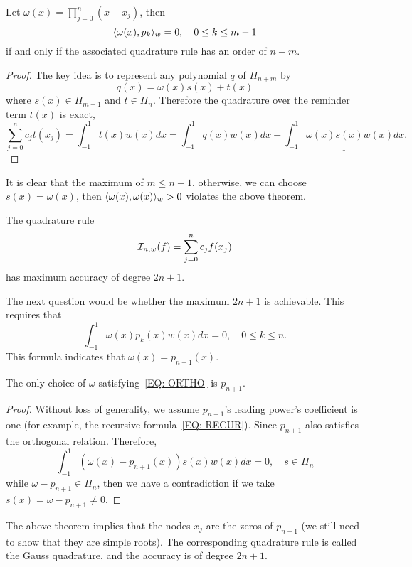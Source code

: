 \begin{theorem}
    Let $\omega(x) = \prod_{j=0}^{n}(x - x_j)$, then
    $$\langle {\omega(x), p_{k}} \rangle_w = 0,\quad 0\le k\le {m-1}$$
    if and only if the associated quadrature rule has an order of $n + m$.
\end{theorem}
\begin{proof}
    The key idea is to represent any polynomial $q$ of $\Pi_{n+m}$ by 
    \begin{equation}
        q(x) = \omega(x) s(x) + t(x)
    \end{equation}
    where $s(x)\in\Pi_{m-1}$ and $t\in \Pi_{n}$. Therefore the quadrature over the reminder term $t(x)$ is exact,
    \begin{equation}
        \sum_{j=0}^n c_j t(x_j) =  \int_{-1}^1 t(x) w(x) dx = \int_{-1}^1 q(x) w(x)dx - \underline{\int_{-1}^1 \omega(x) s(x) w(x) dx}.
    \end{equation}
\end{proof}
It is clear that the maximum of $m \le n+1$, otherwise, we can choose $ s(x) = \omega(x)$, then $\langle {\omega(x), \omega(x)} \rangle_w > 0$ violates the above theorem.
\begin{corollary}
    The quadrature rule 
    $$\mathcal I_{n, w}(f)=\sum_{j=0}^n c_j f(x_j)$$
    has maximum accuracy of degree $2n+1$. 
\end{corollary}
The next question would be whether the maximum $2n+1$ is achievable. This requires that
\begin{equation}\label{EQ: ORTHO}
    \int_{-1}^1 \omega(x) p_k(x) w(x) dx = 0,\quad 0\le k\le n.
\end{equation}
This formula indicates that $\omega(x) = p_{n+1}(x)$.
\begin{theorem}
    The only choice of $\omega$ satisfying~\eqref{EQ: ORTHO} is $p_{n+1}$.
\end{theorem}
\begin{proof}
    Without loss of generality, we assume $p_{n+1}$'s leading power's coefficient is one (for example, the recursive formula~\eqref{EQ: RECUR}). Since $p_{n+1}$ also satisfies the orthogonal relation. Therefore,
    \begin{equation}
        \int_{-1}^1 (\omega(x) - p_{n+1}(x)) s(x) w(x)dx = 0,\quad s\in\Pi_n
    \end{equation}
    while $\omega - p_{n+1}\in\Pi_n$, then we have a contradiction if we take $s(x) = \omega -  p_{n+1}\neq 0$. 
\end{proof}
The above theorem implies that the nodes $x_j$ are the zeros of $p_{n+1}$ (we still need to show that they are simple roots). The corresponding quadrature rule is called the Gauss quadrature, and the accuracy is of degree $2n+1$.

